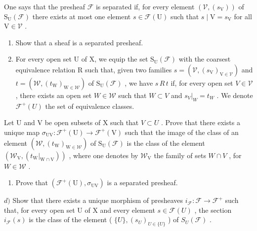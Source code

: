 One says that the presheaf \(\mathcal{F}\) is separated if, for every element \((\mathcal{V},(s_{\mathrm{V}}))\) of \(\mathrm{S_U}(\mathcal{F})\) there exists at most one element \(s\in \mathcal{F}(\mathrm{U})\) such that \(s\mid \mathrm{V} = s_{\mathrm{V}}\) for all \(\mathrm{V}\in \mathcal{V}\) .

\begin{enumerate}
\def\labelenumi{\alph{enumi})}
\item
  Show that a sheaf is a separated presheaf.
\item
  For every open set U of X, we equip the set \(\mathrm{S}_{\mathrm{U}}(\mathcal{F})\) with the coarsest equivalence relation R such that, given two families \(s = (\mathcal{V}, (s_{\mathrm{V}})_{\mathrm{V} \in \mathcal{V}})\) and \(t = (\mathcal{W}, (t_{\mathrm{W}})_{\mathrm{W} \in \mathcal{W}})\) of \(\mathrm{S}_{\mathrm{U}}(\mathcal{F})\) , we have \(s\,R\,t\) if, for every open set \(V \in \mathcal{V}\) , there exists an open set \(W \in \mathcal{W}\) such that \(W \subset V\) and \(s_{V}|_{W} = t_{W}\) . We denote \(\mathcal{F}^{+}(U)\) the set of equivalence classes.
\end{enumerate}

Let U and V be open subsets of X such that \(V \subset U\) . Prove that there exists a unique map \(\sigma_{\mathrm{UV}}: \mathcal{F}^{+}(\mathrm{U}) \to \mathcal{F}^{+}(\mathrm{V})\) such that the image of the class of an element \((\mathcal{W}, (t_{\mathrm{W}})_{\mathrm{W} \in \mathcal{W}})\) of \(\mathrm{S}_{\mathrm{U}}(\mathcal{F})\) is the class of the element \((\mathcal{W}_{\mathrm{V}}, (t_{\mathrm{W}}|_{\mathrm{W} \cap \mathrm{V}}))\) , where one denotes by \(\mathcal{W}_{\mathrm{V}}\) the family of sets \(W \cap V\) , for \(W \in \mathcal{W}\) .

\begin{enumerate}
\def\labelenumi{\alph{enumi})}
\setcounter{enumi}{2}
\tightlist
\item
  Prove that \((\mathcal{F}^{+}(\mathrm{U}),\sigma_{\mathrm{UV}})\) is a separated presheaf.
\end{enumerate}

\(d)\) Show that there exists a unique morphism of presheaves \(i_{\mathcal{F}}: \mathcal{F} \to \mathcal{F}^{+}\) such that, for every open set U of X and every element \(s \in \mathcal{F}(U)\) , the section \(i_{\mathcal{F}}(s)\) is the class of the element ( \(\{U\}, (s_U)_{U \in \{U\}}\) ) of \(S_U(\mathcal{F})\) .

